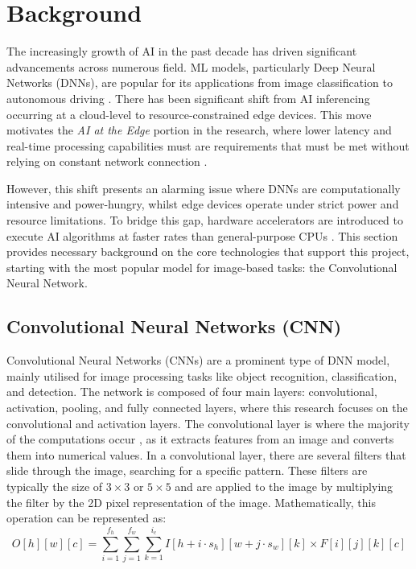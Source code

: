 \documentclass[12pt, a4paper, ukenglish]{article}
\begin{document}
\section{Background} \label{sec: background}
    The increasingly growth of AI in the past decade has driven significant advancements across numerous field. ML models, particularly Deep Neural Networks (DNNs), are popular for its applications from image classification to autonomous driving \cite{parashar_scnn_2017}. There has been significant shift from AI inferencing occurring at a cloud-level to resource-constrained edge devices. This move motivates the \textit{AI at the Edge} portion in the research, where lower latency and real-time processing capabilities must are requirements that must be met without relying on constant network connection \cite{kim_energy-efficient_2020}.

    However, this shift presents an alarming issue where DNNs are computationally intensive and power-hungry, whilst edge devices operate under strict power and resource limitations. To bridge this gap, hardware accelerators are introduced to execute AI algorithms at faster rates than general-purpose CPUs \cite{manor_custom_2022}. This section provides necessary background on the core technologies that support this project, starting with the most popular model for image-based tasks: the Convolutional Neural Network.

    \subsection{Convolutional Neural Networks (CNN)} \label{sec:CNN}
    Convolutional Neural Networks (CNNs) are a prominent type of DNN model, mainly utilised for image processing tasks like object recognition, classification, and detection. The network is composed of four main layers: convolutional, activation, pooling, and fully connected layers, where this research focuses on the convolutional and activation layers. The convolutional layer is where the majority of the computations occur \cite{choi_enabling_2023}, as it extracts features from an image and converts them into numerical values. In a convolutional layer, there are several filters that slide through the image, searching for a specific pattern. These filters are typically the size of $3\times3$ or $5\times5$ and are applied to the image by multiplying the filter by the 2D pixel representation of the image. Mathematically, this operation can be represented as:
    \begin{equation}
    O[h][w][c] = \sum_{i=1}^{f_h} \sum_{j=1}^{f_w} \sum_{k=1}^{i_c} I[h + i \cdot s_h][w + j \cdot s_w][k] \times F[i][j][k][c]
    \end{equation}
\end{document}
